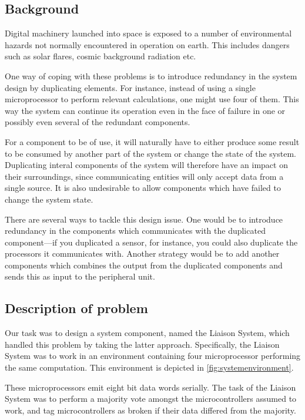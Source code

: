 \subsection{Background}
Digital machinery launched into space is exposed to a number of
environmental hazards not normally encountered in operation on
earth. This includes dangers such as solar flares, cosmic background
radiation etc.\cite{nasa}

One way of coping with these problems is to introduce redundancy in
the system design by duplicating elements. For instance, instead of
using a single microprocessor to perform relevant calculations, one
might use four of them. This way the system can continue its operation
even in the face of failure in one or possibly even several of the
redundant components.

For a component to be of use, it will naturally have to either produce
some result to be consumed by another part of the system or change the
state of the system. Duplicating interal components of the system will
therefore have an impact on their surroundings, since communicating
entities will only accept data from a single source. It is also
undesirable to allow components which have failed to change the system
state.

There are several ways to tackle this design issue. One would be to
introduce redundancy in the components which communicates with the
duplicated component---if you duplicated a sensor, for instance, you
could also duplicate the processors it communicates with. Another
strategy would be to add another components which combines the output
from the duplicated components and sends this as input to the
peripheral unit.

\subsection{Description of problem}   

Our task was to design a system component, named the Liaison System,
which handled this problem by taking the latter
approach. Specifically, the Liaison System was to work in an
environment containing four microprocessor performing the same
computation. This environment is depicted in
\autoref{fig:systemenvironment}. 

\label{fig:systemenvironment}

These microprocessors emit eight bit data words serially. The task of
the Liaison System was to perform a majority vote amongst the
microcontrollers assumed to work, and tag microcontrollers as broken
if their data differed from the majority.

